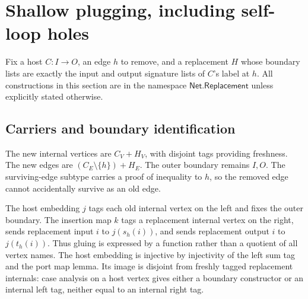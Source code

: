 \section{Shallow plugging, including self-loop holes}
Fix a host $C:I\to O$, an edge $h$ to remove, and a replacement $H$ whose boundary
lists are exactly the input and output signature lists of $C$'s label at $h$.
All constructions in this section are in the namespace $\mathsf{Net.Replacement}$
unless explicitly stated otherwise.

\subsection{Carriers and boundary identification}
\begin{definition}\label{term:replacement-carriers}
The new internal vertices are $C_V+H_V$, with disjoint tags providing freshness.
The new edges are $(C_E\setminus\{h\})+H_E$. The outer boundary remains $I,O$.
The surviving-edge subtype carries a proof of inequality to $h$, so the removed
edge cannot accidentally survive as an old edge.
\end{definition}
The host embedding $j$ tags each old internal vertex on the left and fixes the
outer boundary. The insertion map $k$ tags a replacement internal vertex on the
right, sends replacement input $i$ to $j(s_h(i))$, and sends replacement output
$i$ to $j(t_h(i))$. Thus gluing is expressed by a function rather than a quotient
of all vertex names.
The host embedding is injective by injectivity of the left sum tag and the port
map lemma. Its image is disjoint from freshly tagged replacement internals:
case analysis on a host vertex gives either a boundary constructor or an internal
left tag, neither equal to an internal right tag.

